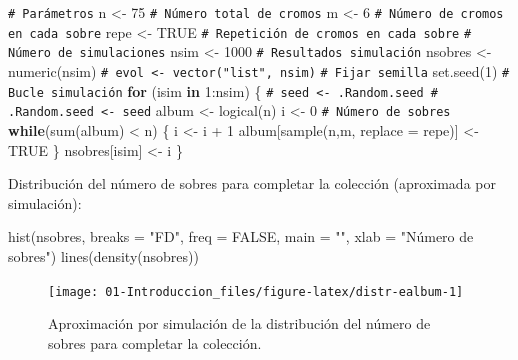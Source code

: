 \documentclass[
  10pt,
]{book}
\newenvironment{Shaded}{\begin{snugshade}}{\end{snugshade}}
\newcommand{\AttributeTok}[1]{\textcolor[rgb]{0.77,0.63,0.00}{#1}}
\newcommand{\CommentTok}[1]{\textcolor[rgb]{0.56,0.35,0.01}{\textit{#1}}}
\newcommand{\ConstantTok}[1]{\textcolor[rgb]{0.00,0.00,0.00}{#1}}
\newcommand{\ControlFlowTok}[1]{\textcolor[rgb]{0.13,0.29,0.53}{\textbf{#1}}}
\newcommand{\DecValTok}[1]{\textcolor[rgb]{0.00,0.00,0.81}{#1}}
\newcommand{\FunctionTok}[1]{\textcolor[rgb]{0.00,0.00,0.00}{#1}}
\newcommand{\NormalTok}[1]{#1}
\newcommand{\OtherTok}[1]{\textcolor[rgb]{0.56,0.35,0.01}{#1}}
\newcommand{\SpecialCharTok}[1]{\textcolor[rgb]{0.00,0.00,0.00}{#1}}
\newcommand{\StringTok}[1]{\textcolor[rgb]{0.31,0.60,0.02}{#1}}
\theoremstyle{break}
\theoremstyle{nonumberplain}
\renewcommand{\CommentTok}[1]{\textcolor[rgb]{0.41,0.41,0.41}{\texttt{#1}}}
\begin{document}
\begin{Shaded}
\begin{Highlighting}[]
\CommentTok{\# Parámetros}
\NormalTok{n }\OtherTok{\textless{}{-}} \DecValTok{75} \CommentTok{\# Número total de cromos}
\NormalTok{m }\OtherTok{\textless{}{-}} \DecValTok{6}  \CommentTok{\# Número de cromos en cada sobre}
\NormalTok{repe }\OtherTok{\textless{}{-}} \ConstantTok{TRUE} \CommentTok{\# Repetición de cromos en cada sobre}
\CommentTok{\# Número de simulaciones}
\NormalTok{nsim }\OtherTok{\textless{}{-}} \DecValTok{1000}
\CommentTok{\# Resultados simulación}
\NormalTok{nsobres }\OtherTok{\textless{}{-}} \FunctionTok{numeric}\NormalTok{(nsim)}
\CommentTok{\# evol \textless{}{-} vector("list", nsim)}
\CommentTok{\# Fijar semilla}
\FunctionTok{set.seed}\NormalTok{(}\DecValTok{1}\NormalTok{)}
\CommentTok{\# Bucle simulación}
\ControlFlowTok{for}\NormalTok{ (isim }\ControlFlowTok{in} \DecValTok{1}\SpecialCharTok{:}\NormalTok{nsim) \{}
  \CommentTok{\# seed \textless{}{-} .Random.seed    \# .Random.seed \textless{}{-} seed}
\NormalTok{  album }\OtherTok{\textless{}{-}} \FunctionTok{logical}\NormalTok{(n)}
\NormalTok{  i }\OtherTok{\textless{}{-}} \DecValTok{0} \CommentTok{\# Número de sobres}
  \ControlFlowTok{while}\NormalTok{(}\FunctionTok{sum}\NormalTok{(album) }\SpecialCharTok{\textless{}}\NormalTok{ n) \{}
\NormalTok{    i }\OtherTok{\textless{}{-}}\NormalTok{ i }\SpecialCharTok{+} \DecValTok{1}
\NormalTok{    album[}\FunctionTok{sample}\NormalTok{(n,m, }\AttributeTok{replace =}\NormalTok{ repe)] }\OtherTok{\textless{}{-}} \ConstantTok{TRUE}
\NormalTok{  \}}
\NormalTok{  nsobres[isim] }\OtherTok{\textless{}{-}}\NormalTok{ i}
\NormalTok{\}}
\end{Highlighting}
\end{Shaded}

Distribución del número de sobres para completar la colección
(aproximada por simulación):

\begin{Shaded}
\begin{Highlighting}[]
\FunctionTok{hist}\NormalTok{(nsobres, }\AttributeTok{breaks =} \StringTok{"FD"}\NormalTok{, }\AttributeTok{freq =} \ConstantTok{FALSE}\NormalTok{,}
     \AttributeTok{main =} \StringTok{""}\NormalTok{, }\AttributeTok{xlab =} \StringTok{"Número de sobres"}\NormalTok{)}
\FunctionTok{lines}\NormalTok{(}\FunctionTok{density}\NormalTok{(nsobres))}
\end{Highlighting}
\end{Shaded}

\begin{figure}[!htbp]

{\centering \texttt{[image: 01-Introduccion\_files/figure-latex/distr-ealbum-1]} 

}

\caption{Aproximación por simulación de la distribución del número de sobres para completar la colección.}\label{fig:distr-ealbum}
\end{figure}
\end{document}
